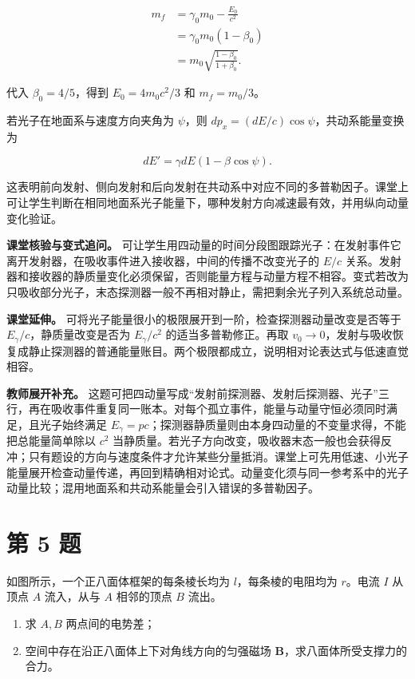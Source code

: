 \documentclass[12pt,a4paper,UTF8]{ctexart}
\newcommand{\tightlist}{\setlength{\itemsep}{0pt}\setlength{\parskip}{0pt}}
\begin{document}
\[
\begin{aligned}
m_f
&=\gamma_0m_0-\frac{E_0}{c^2}\\
&=\gamma_0m_0(1-\beta_0)\\
&=m_0\sqrt{\frac{1-\beta_0}{1+\beta_0}}.
\end{aligned}
\]

代入 \(\beta_0=4/5\)，得到 \(E_0=4m_0c^2/3\) 和 \(m_f=m_0/3\)。

若光子在地面系与速度方向夹角为 \(\psi\)，则
\(dp_x=(dE/c)\cos\psi\)，共动系能量变换为

\[
dE'=\gamma dE(1-\beta\cos\psi).
\]

这表明前向发射、侧向发射和后向发射在共动系中对应不同的多普勒因子。课堂上可让学生判断在相同地面系光子能量下，哪种发射方向减速最有效，并用纵向动量变化验证。

\textbf{课堂核验与变式追问。}
可让学生用四动量的时间分段图跟踪光子：在发射事件它离开发射器，在吸收事件进入接收器，中间的传播不改变光子的
\(E/c\)
关系。发射器和接收器的静质量变化必须保留，否则能量方程与动量方程不相容。变式若改为只吸收部分光子，末态探测器一般不再相对静止，需把剩余光子列入系统总动量。

\textbf{课堂延伸。}
可将光子能量很小的极限展开到一阶，检查探测器动量改变是否等于
\(E_\gamma/c\)，静质量改变是否为 \(E_\gamma/c^2\) 的适当多普勒修正。再取
\(v_0\to0\)，发射与吸收恢复成静止探测器的普通能量账目。两个极限都成立，说明相对论表达式与低速直觉相容。

\textbf{教师展开补充。}
这题可把四动量写成``发射前探测器、发射后探测器、光子''三行，再在吸收事件重复同一账本。对每个孤立事件，能量与动量守恒必须同时满足，且光子始终满足
\(E_\gamma=pc\)；探测器静质量则由本身四动量的不变量求得，不能把总能量简单除以
\(c^2\)
当静质量。若光子方向改变，吸收器末态一般也会获得反冲；只有题设的方向与速度条件才允许某些分量抵消。课堂上可先用低速、小光子能量展开检查动量传递，再回到精确相对论式。动量变化须与同一参考系中的光子动量比较；混用地面系和共动系能量会引入错误的多普勒因子。

\newpage

\section{第 5 题}\label{ux7b2c-5-ux9898}

如图所示，一个正八面体框架的每条棱长均为 \(l\)，每条棱的电阻均为
\(r\)。电流 \(I\) 从顶点 \(A\) 流入，从与 \(A\) 相邻的顶点 \(B\) 流出。

\begin{enumerate}
\def\labelenumi{\arabic{enumi}.}
\tightlist
\item
  求 \(A,B\) 两点间的电势差；
\item
  空间中存在沿正八面体上下对角线方向的匀强磁场
  \(\bm B\)，求八面体所受支撑力的合力。
\end{enumerate}
\end{document}
